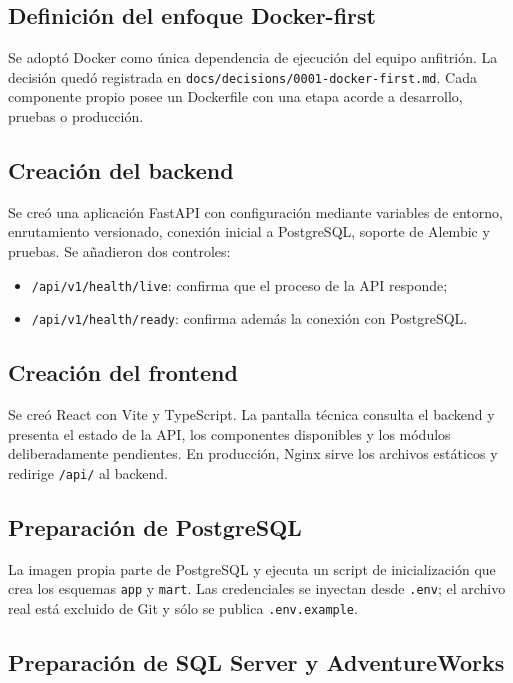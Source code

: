 \documentclass[11pt,letterpaper]{article}
\newcommand{\file}[1]{\texttt{#1}}
\begin{document}
\subsection{Definición del enfoque Docker-first}

Se adoptó Docker como única dependencia de ejecución del equipo anfitrión. La decisión quedó registrada en \file{docs/decisions/0001-docker-first.md}. Cada componente propio posee un Dockerfile con una etapa acorde a desarrollo, pruebas o producción.

\subsection{Creación del backend}

Se creó una aplicación FastAPI con configuración mediante variables de entorno, enrutamiento versionado, conexión inicial a PostgreSQL, soporte de Alembic y pruebas. Se añadieron dos controles:

\begin{itemize}
  \item \file{/api/v1/health/live}: confirma que el proceso de la API responde;
  \item \file{/api/v1/health/ready}: confirma además la conexión con PostgreSQL.
\end{itemize}

\subsection{Creación del frontend}

Se creó React con Vite y TypeScript. La pantalla técnica consulta el backend y presenta el estado de la API, los componentes disponibles y los módulos deliberadamente pendientes. En producción, Nginx sirve los archivos estáticos y redirige \file{/api/} al backend.

\subsection{Preparación de PostgreSQL}

La imagen propia parte de PostgreSQL y ejecuta un script de inicialización que crea los esquemas \file{app} y \file{mart}. Las credenciales se inyectan desde \file{.env}; el archivo real está excluido de Git y sólo se publica \file{.env.example}.

\subsection{Preparación de SQL Server y AdventureWorks}
\end{document}
